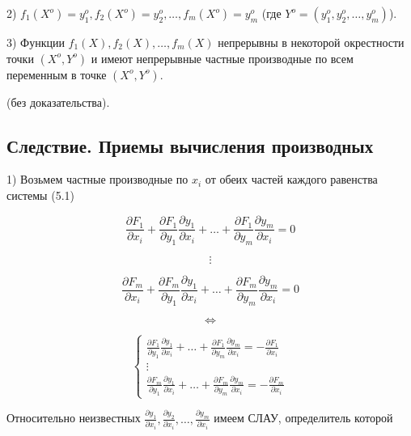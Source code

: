 {2) \( f_1(X^o) = y_1^o, f_2(X^o) = y_2^o, \dots, f_m(X^o) = y_m^o \) (где \( Y^o = (y_1^o, y_2^o, \dots, y_m^o) \)).

3) Функции \( f_1(X), f_2(X), \dots, f_m(X) \) непрерывны в некоторой окрестности точки \( (X^o, Y^o) \) и имеют непрерывные частные производные по всем переменным в точке \( (X^o, Y^o) \).

(без доказательства).

\subsection*{Следствие. Приемы вычисления производных}

1) Возьмем частные производные по \( x_i \) от обеих частей каждого равенства системы (5.1)



\[
\frac{\partial F_1}{\partial x_i} + \frac{\partial F_1}{\partial y_1} \frac{\partial y_1}{\partial x_i} + \ldots + \frac{\partial F_1}{\partial y_m} \frac{\partial y_m}{\partial x_i} = 0
\]





\[
\vdots
\]





\[
\frac{\partial F_m}{\partial x_i} + \frac{\partial F_m}{\partial y_1} \frac{\partial y_1}{\partial x_i} + \ldots + \frac{\partial F_m}{\partial y_m} \frac{\partial y_m}{\partial x_i} = 0
\]





\[
\Leftrightarrow
\]





\[
\begin{cases}
\frac{\partial F_1}{\partial y_1} \frac{\partial y_1}{\partial x_i} + \ldots + \frac{\partial F_1}{\partial y_m} \frac{\partial y_m}{\partial x_i} = -\frac{\partial F_1}{\partial x_i} \\
\vdots \\
\frac{\partial F_m}{\partial y_1} \frac{\partial y_1}{\partial x_i} + \ldots + \frac{\partial F_m}{\partial y_m} \frac{\partial y_m}{\partial x_i} = -\frac{\partial F_m}{\partial x_i}
\end{cases}
\]



Относительно неизвестных \( \frac{\partial y_1}{\partial x_i}, \frac{\partial y_2}{\partial x_i}, \ldots, \frac{\partial y_m}{\partial x_i} \) имеем СЛАУ, определитель которой



}
